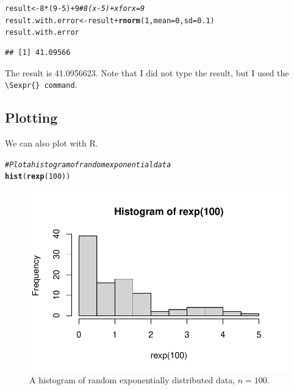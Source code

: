 \documentclass{article}\usepackage[]{graphicx}\usepackage[]{xcolor}
\makeatletter
\def\maxwidth{ %
  \ifdim\Gin@nat@width>\linewidth
    \linewidth
  \else
    \Gin@nat@width
  \fi
}
\newcommand{\hlnum}[1]{\textcolor[rgb]{0.686,0.059,0.569}{#1}}%
\newcommand{\hlcom}[1]{\textcolor[rgb]{0.678,0.584,0.686}{\textit{#1}}}%
\newcommand{\hlopt}[1]{\textcolor[rgb]{0,0,0}{#1}}%
\newcommand{\hldef}[1]{\textcolor[rgb]{0.345,0.345,0.345}{#1}}%
\newcommand{\hlkwb}[1]{\textcolor[rgb]{0.69,0.353,0.396}{#1}}%
\newcommand{\hlkwc}[1]{\textcolor[rgb]{0.333,0.667,0.333}{#1}}%
\newcommand{\hlkwd}[1]{\textcolor[rgb]{0.737,0.353,0.396}{\textbf{#1}}}%
\newenvironment{kframe}{%
 \def\at@end@of@kframe{}%
 \ifinner\ifhmode%
  \def\at@end@of@kframe{\end{minipage}}%
  \begin{minipage}{\columnwidth}%
 \fi\fi%
 \def\FrameCommand##1{\hskip\@totalleftmargin \hskip-\fboxsep
 \colorbox{shadecolor}{##1}\hskip-\fboxsep
     \hskip-\linewidth \hskip-\@totalleftmargin \hskip\columnwidth}%
 \MakeFramed {\advance\hsize-\width
   \@totalleftmargin\z@ \linewidth\hsize
   \@setminipage}}%
 {\par\unskip\endMakeFramed%
 \at@end@of@kframe}
\newenvironment{knitrout}{}{} %
\makeatother
\begin{document}
\begin{multicols}{2}
\begin{knitrout}
\color{fgcolor}\begin{kframe}
\begin{alltt}
\hldef{result} \hlkwb{<-} \hlnum{8}\hlopt{*}\hldef{(}\hlnum{9}\hlopt{-}\hlnum{5}\hldef{)} \hlopt{+} \hlnum{9}  \hlcom{# 8(x-5) + x for x=9}
\hldef{result.with.error} \hlkwb{<-} \hldef{result} \hlopt{+} \hlkwd{rnorm}\hldef{(}\hlnum{1}\hldef{,} \hlkwc{mean} \hldef{=} \hlnum{0}\hldef{,} \hlkwc{sd} \hldef{=} \hlnum{0.1}\hldef{)}
\hldef{result.with.error}
\end{alltt}
\begin{verbatim}
## [1] 41.09566
\end{verbatim}
\end{kframe}
\end{knitrout}
The result is 41.0956623. Note that I did not type the result, but I used the \verb|\Sexpr{} command|.
\subsection{Plotting}
We can also plot with R.
\begin{knitrout}\scriptsize
{}\color{fgcolor}\begin{kframe}
\begin{alltt}
\hlcom{#Plot a histogram of random exponential data}
\hlkwd{hist}\hldef{(}\hlkwd{rexp}\hldef{(}\hlnum{100}\hldef{))}
\end{alltt}
\end{kframe}
\end{knitrout}
\begin{figure}[H]
\begin{center}
\begin{knitrout}
\color{fgcolor}
\includegraphics[width=\maxwidth]{figure/unnamed-chunk-6-1} 
\end{knitrout}
\caption{A histogram of random exponentially distributed data, $n=100$.}
\label{plot1} %
\end{center}
\end{figure}

\end{multicols}
\end{document}
